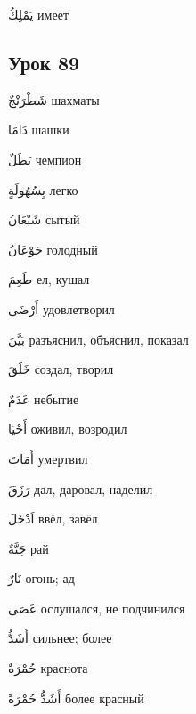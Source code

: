 \documentclass[a5paper]{article}
\newcommand\textstyleDropCaps[1]{#1}
\newcommand\textstyleCaptioncharacters[1]{#1}
\begin{document}
\textstyleCaptioncharacters{يَمْلِكُ }\textstyleDropCaps{имеет‎}

\subsection[Урок 89‎]{\textstyleDropCaps{Урок 89‎}}
\textstyleCaptioncharacters{شَطْرَنْجٌ }\textstyleDropCaps{шахматы‎}

\textstyleCaptioncharacters{دَامَا }\textstyleDropCaps{шашки‎}

\textstyleCaptioncharacters{بَطَلٌ }\textstyleDropCaps{чемпион‎}

\textstyleCaptioncharacters{بِسُهُولَةٍ }\textstyleDropCaps{легко‎}

\textstyleCaptioncharacters{شَبْعَانُ }\textstyleDropCaps{сытый‎}

\textstyleCaptioncharacters{جَوْعَانُ }\textstyleDropCaps{голодный‎}

\textstyleCaptioncharacters{طَعِمَ }\textstyleDropCaps{ел, кушал‎}

\textstyleCaptioncharacters{أَرْضَى }\textstyleDropCaps{удовлетворил‎}

\textstyleCaptioncharacters{بَيَّنَ }\textstyleDropCaps{разъяснил, объяснил, показал‎}

\textstyleCaptioncharacters{خَلَقَ }\textstyleDropCaps{создал, творил‎}

\textstyleCaptioncharacters{عَدَمٌ }\textstyleDropCaps{небытие‎}

\textstyleCaptioncharacters{أَحْيَا }\textstyleDropCaps{оживил, возродил‎}

\textstyleCaptioncharacters{أَمَاتَ }\textstyleDropCaps{умертвил‎}

\textstyleCaptioncharacters{رَزَقَ }\textstyleDropCaps{дал, даровал, наде­лил‎}

\textstyleCaptioncharacters{اَدْخَلَ }\textstyleDropCaps{ввёл, завёл‎}

\textstyleCaptioncharacters{جَنَّةٌ }\textstyleDropCaps{рай‎}

\textstyleCaptioncharacters{نَارٌ }\textstyleDropCaps{огонь; ад‎}

\textstyleCaptioncharacters{عَصَى }\textstyleDropCaps{ослушался, не под­чинился‎}

\textstyleCaptioncharacters{أَشَدُّ }\textstyleDropCaps{сильнее; более‎}

\textstyleCaptioncharacters{حُمْرَةٌ }\textstyleDropCaps{краснота‎}

\textstyleCaptioncharacters{أَشَدُّ حُمْرَةً }\textstyleDropCaps{более крас­ный‎}
\end{document}
